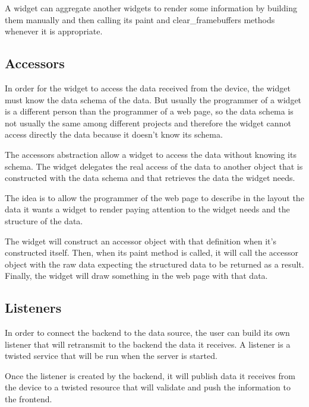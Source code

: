 \documentclass[12pt]{article}
\begin{document}
            A widget can aggregate another widgets to render some information by
            building them manually and then calling its paint and
            clear\_framebuffers methods whenever it is appropriate.

        \subsection{Accessors}
            In order for the widget to access the data received from the device,
            the widget must know the data schema of the data. But usually the
            programmer of a widget is a different person than the programmer of
            a web page, so the data schema is not usually the same among
            different projects and therefore the widget cannot access directly
            the data because it doesn't know its schema.

            The accessors abstraction allow a widget to access the data without
            knowing its schema. The widget delegates the real access of the data
            to another object that is constructed with the data schema and that
            retrieves the data the widget needs.

            The idea is to allow the programmer of the web page to describe in
            the layout the data it wants a widget to render paying attention to
            the widget needs and the structure of the data.
            
            The widget will construct an accessor object with that definition
            when it's constructed itself. Then, when its paint method is called,
            it will call the accessor object with the raw data expecting the
            structured data to be returned as a result. Finally, the widget will
            draw something in the web page with that data.

        \subsection{Listeners}
            In order to connect the backend to the data source, the user can
            build its own listener that will retransmit to the backend the data
            it receives. A listener is a twisted service that will be run when
            the server is started.

            Once the listener is created by the backend, it will publish data it
            receives from the device to a twisted resource that will validate
            and push the information to the frontend.
\end{document}
